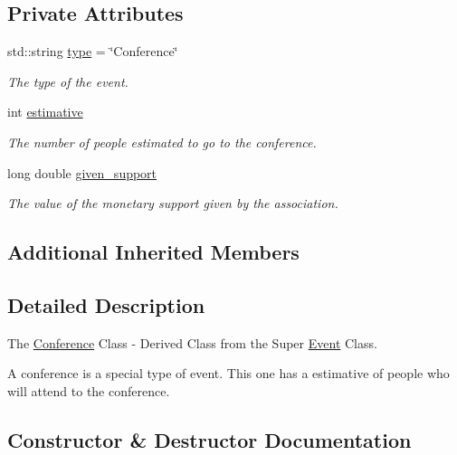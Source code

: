 \subsection*{Private Attributes}
\begin{DoxyCompactItemize}
\item 
std\+::string \mbox{\hyperlink{classConference_af456d5097dc28808360f0d0fba2160c6}{type}} = \char`\"{}Conference\char`\"{}
\begin{DoxyCompactList}\small\item\em The type of the event. \end{DoxyCompactList}\item 
int \mbox{\hyperlink{classConference_ab3acc9b9aec3a4dbcfd18d1611337ecb}{estimative}}
\begin{DoxyCompactList}\small\item\em The number of people estimated to go to the conference. \end{DoxyCompactList}\item 
long double \mbox{\hyperlink{classConference_a800a31bff9c492bc417cf8cecf450195}{given\+\_\+support}}
\begin{DoxyCompactList}\small\item\em The value of the monetary support given by the association. \end{DoxyCompactList}\end{DoxyCompactItemize}
\subsection*{Additional Inherited Members}


\subsection{Detailed Description}
The \mbox{\hyperlink{classConference}{Conference}} Class -\/ Derived Class from the Super \mbox{\hyperlink{classEvent}{Event}} Class. 

A conference is a special type of event. This one has a estimative of people who will attend to the conference. 

\subsection{Constructor \& Destructor Documentation}
\mbox{\label{classConference_a433a85d640693398c2c96a2a655fc6f4}} 
